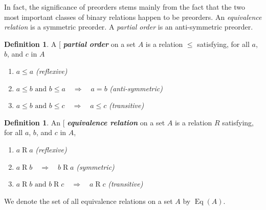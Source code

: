 \documentclass[12pt]{article}
\theoremstyle{plain}
\theoremstyle{definition}
\newtheorem{definition}[theorem]{Definition}
\theoremstyle{remark}
\theoremstyle{remark}
\numberwithin{theorem}{section}
\numberwithin{equation}{section}
\newcommand{\<}{\ensuremath{\langle}}
\renewcommand{\>}{\ensuremath{\rangle}}
\newcommand{\rel}[1]{\ensuremath{\mathbin{#1}}}
\renewcommand{\leq}{\ensuremath{\leqslant}}
\newcommand{\Eq}{\ensuremath{\operatorname{Eq}}}
\newcommand{\indexit}[1]{\index{#1|textit}}
\def\defn#1{\gdef\defnstring{#1}%
  \xdef\dodefnii{{\noexpand\bfseries\noexpand\em
       \defnstring}\noexpand\indexit{\defnstring}\noexpand\makeatother}%
  \futurelet\nextthing\dodefn}
\def\dodefn{%
  \ifx\nextthing[\let\next=\dodefni
    \else\let\next=\dodefnii\fi
  \makeatletter
  \next}
\def\dodefni[#1]{%
  {\bfseries\em\defnstring}%
  \indexit{#1}%
  \makeatother}
\begin{document}
In fact, the significance of preorders stems mainly from the fact that the
two most important classes of binary relations happen to be preorders.
An \emph{equivalence relation} is a symmetric preorder. A
\emph{partial order} is an anti-symmetric preorder.

\begin{definition}
\noindent 
A \defn{partial order} %
on a set $A$ is a relation
$\leq$ satisfying, for all $a$, $b$, and $c$ in $A$
\begin{enumerate}
\item $a\leq a$ \hspace{55mm} \emph{(reflexive)} 
\item $a\leq b \text{ and } b\leq a \quad \Longrightarrow \quad a=b$ \hspace{1cm} \emph{(anti-symmetric)} 
\item $a\leq b \text{ and } b\leq c \quad \Longrightarrow \quad a\leq c$ \hspace{1cm} \emph{(transitive)} 
\end{enumerate}
\end{definition}



\begin{definition}
An \defn{equivalence relation} %
on a set $A$ is a relation
$R$ satisfying, for all $a$, $b$, and $c$ in $A$,
\begin{enumerate}
\item $a \rel{R} a$ \hspace{58mm} \emph{(reflexive)} 
\item $a \rel{R} b \quad \Longrightarrow \quad b\rel{R} a$ \hspace{32mm} \emph{(symmetric)} 
\item $a\rel{R} b \text{ and } b\rel{R} c \quad \Longrightarrow \quad a\rel{R} c$ \hspace{14mm} \emph{(transitive)} 
\end{enumerate}
\end{definition}

We denote the set of all equivalence relations on a set $A$ by $\Eq(A)$.  
\end{document}
